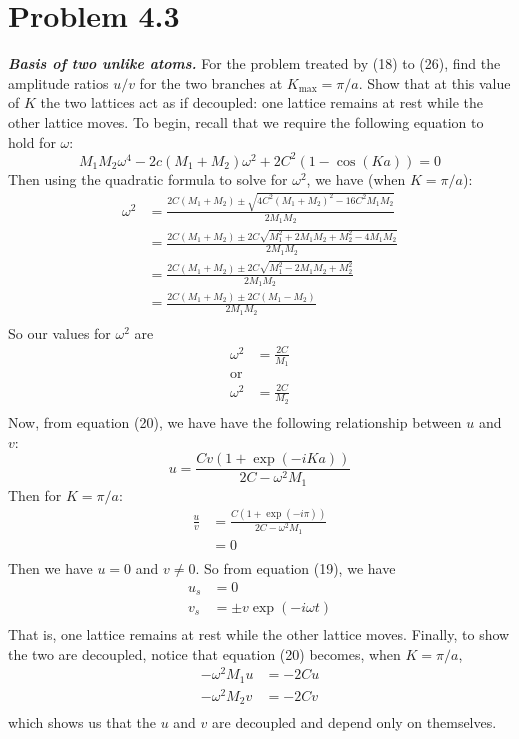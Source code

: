 \documentclass{article}
\begin{document}
\section*{Problem 4.3}
\textit{\textbf{Basis of two unlike atoms.}} For the problem treated by (18) to (26), find the amplitude ratios $u/v$ for the two branches at $K_{\text{max}} = \pi/a$. Show that at this value of $K$ the two lattices act as if decoupled: one lattice remains at rest while the other lattice moves.
\newline\newline
To begin, recall that we require the following equation to hold for $\omega$:
\[M_1M_2\omega^4 - 2c(M_1 + M_2)\omega^2 + 2C^2(1 - \cos{(Ka)}) = 0\]
Then using the quadratic formula to solve for $\omega^2$, we have (when $K = \pi/a$):
\begin{align*}
    \omega^2 &= \frac{2C(M_1 + M_2) \pm \sqrt{4C^2(M_1 + M_2)^2 - 16C^2M_1M_2}}{2M_1M_2} \\
    &= \frac{2C(M_1 + M_2) \pm 2C\sqrt{M_1^2 + 2M_1M_2 + M_2^2 - 4M_1M_2}}{2M_1M_2} \\
    &= \frac{2C(M_1 + M_2) \pm 2C\sqrt{M_1^2 - 2M_1M_2 + M_2^2}}{2M_1M_2} \\
    &= \frac{2C(M_1 + M_2) \pm 2C(M_1 - M_2)}{2M_1M_2} \\
\end{align*}
So our values for $\omega^2$ are 
\begin{align*}
    \omega^2 &= \frac{2C}{M_1} \\
    \text{or} \\
    \omega^2 &= \frac{2C}{M_2} \\
\end{align*}
Now, from equation (20), we have have the following relationship between $u$ and $v$:
\[u = \frac{Cv(1 + \exp{(-iKa)})}{2C - \omega^2M_1}\]
Then for $K = \pi/a$:
\begin{align*}
    \frac{u}{v} &= \frac{C(1 + \exp{(-i\pi)})}{2C - \omega^2M_1} \\
    &= 0 \\
\end{align*}
Then we have $u = 0$ and $v \neq 0$. So from equation (19), we have
\begin{align*}
    u_s &= 0\\
    v_s &= \pm v\exp{(-i\omega t)} \\
\end{align*}
That is, one lattice remains at rest while the other lattice moves. Finally, to show the two are decoupled, notice that equation (20) becomes, when $K = \pi/a$,
\begin{align*}
    -\omega^2M_1u &= -2Cu\\
    -\omega^2M_2v &= -2Cv\\
\end{align*}
which shows us that the $u$ and $v$ are decoupled and depend only on themselves.
\end{document}
